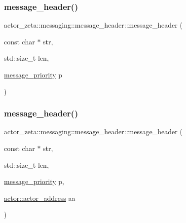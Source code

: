 \mbox{\label{classactor__zeta_1_1messaging_1_1message__header_a1c8d3f0bac1b4e517e51e9dbf6f89235}} 
\subsubsection{\texorpdfstring{message\+\_\+header()}{message\_header()}\hspace{0.1cm}{\footnotesize\ttfamily [10/11]}}
{\footnotesize\ttfamily actor\+\_\+zeta\+::messaging\+::message\+\_\+header\+::message\+\_\+header (\begin{DoxyParamCaption}\item[{const char $\ast$}]{str,  }\item[{std\+::size\+\_\+t}]{len,  }\item[{\hyperlink{namespaceactor__zeta_1_1messaging_a1b4c4b3ab625eb033c15da4fbe9c4a89}{message\+\_\+priority}}]{p }\end{DoxyParamCaption})}

\mbox{\label{classactor__zeta_1_1messaging_1_1message__header_ad8161f6856a55dd6ede0fff131b17a6a}} 
\subsubsection{\texorpdfstring{message\+\_\+header()}{message\_header()}\hspace{0.1cm}{\footnotesize\ttfamily [11/11]}}
{\footnotesize\ttfamily actor\+\_\+zeta\+::messaging\+::message\+\_\+header\+::message\+\_\+header (\begin{DoxyParamCaption}\item[{const char $\ast$}]{str,  }\item[{std\+::size\+\_\+t}]{len,  }\item[{\hyperlink{namespaceactor__zeta_1_1messaging_a1b4c4b3ab625eb033c15da4fbe9c4a89}{message\+\_\+priority}}]{p,  }\item[{\hyperlink{classactor__zeta_1_1actor_1_1actor__address}{actor\+::actor\+\_\+address}}]{aa }\end{DoxyParamCaption})}



